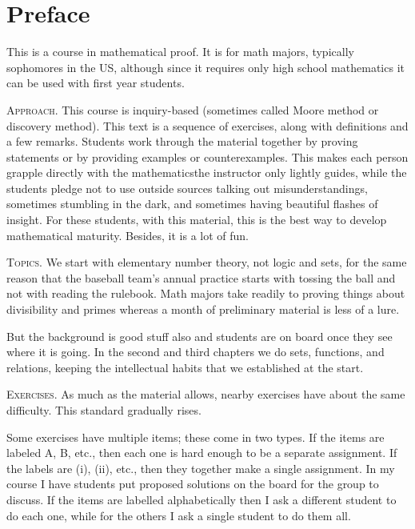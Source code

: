 \chapter*{Preface}

This is a course in mathematical proof. 
It is for math majors, typically sophomores in the US, although since
it requires only high school mathematics
it can be used with first year students.



\medskip
\noindent\textsc{Approach.}
This course is inquiry-based (sometimes called Moore method 
or discovery method).
This text is a sequence of exercises,
along with definitions and a few remarks.
Students work through the material together by
proving statements or by providing examples or counterexamples.
This makes each person grapple directly with the 
mathematics\Dash the instructor only 
lightly guides, while the students pledge not to use outside sources\Dash
talking out misunderstandings, 
sometimes stumbling in the dark, and sometimes
having beautiful flashes of insight.
For these students, with this material,
this is the best way to develop mathematical maturity.
Besides, it is a lot of fun.


\medskip
\noindent\textsc{Topics.}
We start with elementary number theory, not logic and sets, 
for the same reason
that the baseball team's annual practice starts with tossing the ball and 
not with reading the rulebook.
Math majors take readily to proving things about
divisibility and primes 
whereas a month of preliminary material is less of a lure.

But the background is good stuff also and 
students are on board once they see where it is going.
In the second and third chapters we do
sets, functions, and relations, keeping the
intellectual habits that we established at the start.



\medskip
\noindent\textsc{Exercises.}
As much as the material allows,
nearby exercises have about the same difficulty.
This standard gradually rises.

Some exercises have multiple items; these come in two types.
If the items are labeled \textsc{A}, \textsc{B}, etc., 
then each one is hard enough to be a separate assignment.
If the labels are (i), (ii), etc., then they together make
a single assignment.
In my course I have students put proposed solutions on the board
for the group to discuss.
If the items are labelled alphabetically then I ask a different student
to do each one, while for the others I ask a single student to do them all.

